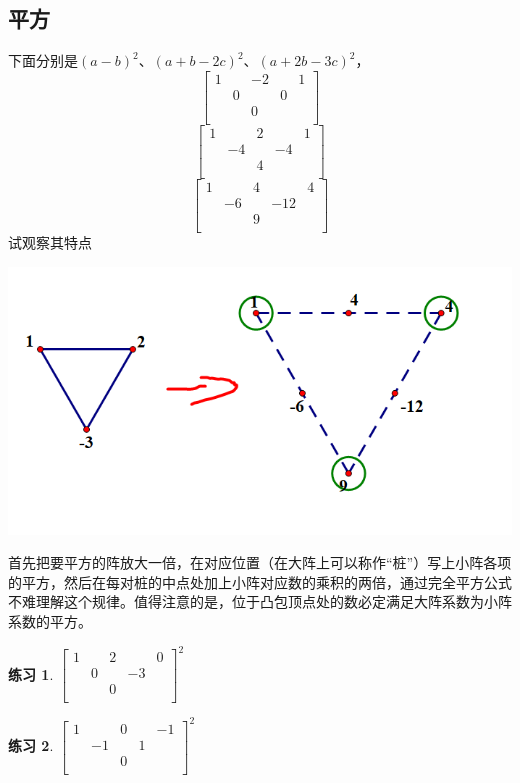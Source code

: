 \documentclass[UTF8]{ctexart}
\newtheorem{3}{练习}
\begin{document}
\subsection{平方}
下面分别是$ (a-b)^{2} $、$ (a+b-2c)^{2} $、$ (a+2b-3c)^{2} $，
\renewcommand*{\arraystretch}{1.732}\[\left[\begin{matrix}
	1& &-2& &1\\
	&0& &0&\\
	& &0& &\\
\end{matrix}\right]\]
\renewcommand*{\arraystretch}{1.732}\[\left[\begin{matrix}
	1& &2& &1\\
	&-4& &-4&\\
	& &4& &\\
\end{matrix}\right]\]
\renewcommand*{\arraystretch}{1.732}\[\left[\begin{matrix}
	1& &4& &4\\
	&-6& &-12&\\
	& &9& &\\
\end{matrix}\right]\]
试观察其特点
\begin{center}
	\includegraphics[width=0.5\linewidth]{26}
\end{center}
首先把要平方的阵放大一倍，在对应位置（在大阵上可以称作“桩”）写上小阵各项的平方，然后在每对桩的中点处加上小阵对应数的乘积的两倍，通过完全平方公式不难理解这个规律。值得注意的是，位于凸包顶点处的数必定满足大阵系数为小阵系数的平方。\\
\begin{3}
	$ \left[\begin{matrix}
		1& &2& &0\\
		&0& &-3&\\
		& &0& &\\
	\end{matrix}\right]^{2}$
\end{3}
\begin{3}
	$ \left[\begin{matrix}
		1& &0& &-1\\
		&-1& &1&\\
		& &0& &\\
	\end{matrix}\right]^{2} $
\end{3}
\end{document}
